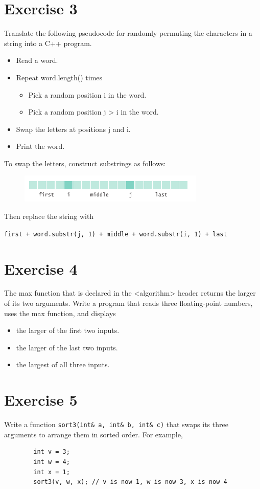 \documentclass[10pt,a4paper]{article}
\begin{document}
	\section*{Exercise 3}
	Translate the following pseudocode for randomly permuting the characters in a string into a C++ program.
	\begin{itemize}
		\item Read a word.
		\item Repeat word.length() times
		\begin{itemize}
			\item Pick a random position i in the word.
			\item Pick a random position j > i in the word.
		\end{itemize}
		\item Swap the letters at positions j and i.
		\item Print the word.
	\end{itemize}
	To swap the letters, construct substrings as follows:
	\begin{figure}[H]
		\centering
		\includegraphics[width=0.7\linewidth]{assign3_fig1}
		\label{fig:assign3fig1}
	\end{figure}
	
	Then replace the string with
	
	\verb|first + word.substr(j, 1) + middle + word.substr(i, 1) + last|
	
	\section*{Exercise 4}
	The max function that is declared in the <algorithm> header returns the larger of its two
	arguments. Write a program that reads three floating-point numbers, uses the max 	function, and displays
	\begin{itemize}
		\item the larger of the first two inputs.
		\item the larger of the last two inputs.
		\item the largest of all three inputs.
	\end{itemize}
	
	\section*{Exercise 5}
	Write a function \verb|sort3(int& a, int& b, int& c)| that swaps its three arguments to
	arrange them in sorted order. For example,
	\begin{verbatim}
		int v = 3;
		int w = 4;
		int x = 1;
		sort3(v, w, x); // v is now 1, w is now 3, x is now 4	
	\end{verbatim}
	
\end{document}
